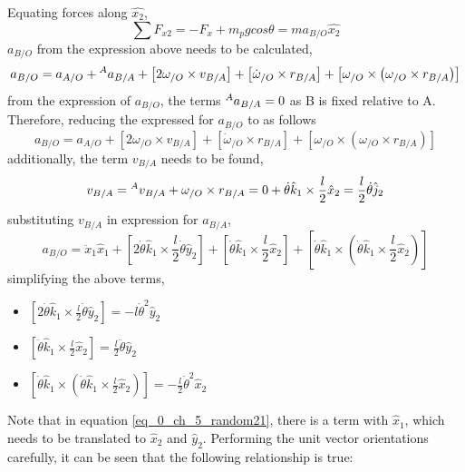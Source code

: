 Equating forces along $\hat{x_{2}}$,
\begin{equation}\label{eq_0_ch_5_random22}
	\sum F_{x2} = -F_{x} + m_{p} g cos\theta = m a_{B/O} \hat{x_{2}}
\end{equation}
$a_{B/O}$ from the expression above needs to be calculated,
\begin{equation}
	a_{B/O} = a_{A/O} + \prescript{A}{}{a_{B/A}} + \left[2\omega_{/O} \times v_{B/A}\right] + \left[\dot{\omega}_{/O} \times r_{B/A}\right] + \left[\omega_{/O} \times \left(\omega_{/O} \times r_{B/A}\right)\right]
\end{equation}
from the expression of $a_{B/O}$, the terms $\prescript{A}{}{a_{B/A}} = 0$ as B is fixed relative to A. Therefore, reducing the expressed for $a_{B/O}$ to as follows
\begin{equation}
a_{B/O} = a_{A/O} + \left[2\omega_{/O} \times v_{B/A}\right] + \left[\dot{\omega}_{/O} \times r_{B/A}\right] + \left[\omega_{/O} \times \left(\omega_{/O} \times r_{B/A}\right)\right]
\end{equation}
additionally, the term $v_{B/A}$ needs to be found,
\begin{equation}
	v_{B/A} = \prescript{A}{}{v_{B/A}} + \omega_{/O} \times r_{B/A} = 0 + \dot{\theta}\hat{k}_{1} \times \frac{l}{2}\hat{x}_{2} = \frac{l}{2}\dot{\theta}\hat{j}_{2}
\end{equation}
substituting $v_{B/A}$ in expression for $a_{B/A}$,
\begin{equation}\label{eq_0_ch_5_random21}
a_{B/O} = \ddot{x}_{1}\hat{x}_{1} + \left[2\dot{\theta}\hat{k}_{1} \times \frac{l}{2}\dot{\theta}\hat{y}_{2}\right] + \left[\dot{\theta}\hat{k}_{1} \times \frac{l}{2}\hat{x}_{2}\right] + \left[\dot{\theta}\hat{k}_{1} \times \left(\dot{\theta}\hat{k}_{1} \times \frac{l}{2}\hat{x}_{2}\right)\right]
\end{equation}
simplifying the above terms,
\begin{itemize}
	\item $\left[2\dot{\theta}\hat{k}_{1} \times \frac{l}{2}\dot{\theta}\hat{y}_{2}\right] = - l \dot{\theta}^{2} \hat{y}_{2}$
	\item $\left[\ddot{\theta}\hat{k}_{1} \times \frac{l}{2}\hat{x}_{2}\right] = \frac{l}{2}\ddot{\theta}\hat{y}_{2}$
	\item $\left[\dot{\theta}\hat{k}_{1} \times \left(\dot{\theta}\hat{k}_{1} \times \frac{l}{2}\hat{x}_{2}\right)\right] = - \frac{l}{2}\dot{\theta}^{2} \hat{x}_{2}$
\end{itemize}
Note that in equation \eqref{eq_0_ch_5_random21}, there is a term with $\hat{x}_{1}$, which needs to be translated to $\hat{x}_{2}$ and $\hat{y}_{2}$. Performing the unit vector orientations carefully, it can be seen that the following relationship is true:
